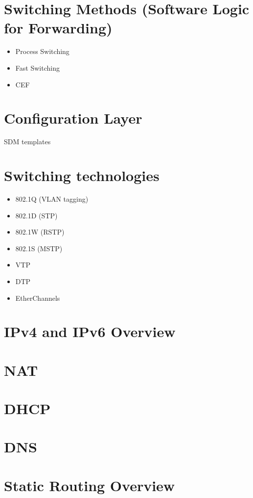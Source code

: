 \documentclass{article}
\begin{document}
\section*{Switching Methods (Software Logic for Forwarding)}
	\begin{itemize}
		\item Process Switching
		\item Fast Switching
		\item CEF
	\end{itemize}

\section*{Configuration Layer}
SDM templates

\section*{Switching technologies}
	\begin{itemize}
		\item 802.1Q (VLAN tagging)
		\item 802.1D (STP)
		\item 802.1W (RSTP)
		\item 802.1S (MSTP)
		\item VTP
		\item DTP
		\item EtherChannels
	\end{itemize}

\section*{IPv4 and IPv6 Overview}

\section*{NAT}

\section*{DHCP}

\section*{DNS}

\section*{Static Routing Overview}
\end{document}
